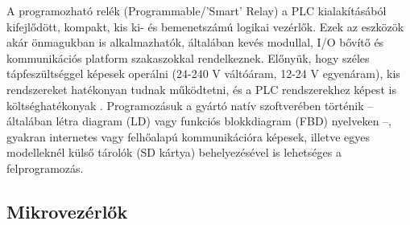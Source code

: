 A programozható relék (Programmable/'Smart' Relay) a PLC kialakításából kifejlődött, kompakt, kis ki- és bemenetszámú logikai vezérlők. Ezek az eszközök akár önmagukban is alkalmazhatók, általában kevés modullal, I/O bővítő és kommunikációs platform szakaszokkal rendelkeznek. Előnyük, hogy széles tápfeszültséggel képesek operálni (24-240 V váltóáram, 12-24 V egyenáram), kis rendszereket hatékonyan tudnak működtetni, és a PLC rendszerekhez képest is költséghatékonyak \cite{zeliologic_catalog}. Programozásuk a gyártó natív szoftverében történik -- általában létra diagram (LD) vagy funkciós blokkdiagram (FBD) nyelveken --, gyakran internetes vagy felhőalapú kommunikációra képesek, illetve egyes modelleknél külső tárolók (SD kártya) behelyezésével is lehetséges a felprogramozás.

\subsection{Mikrovezérlők}

